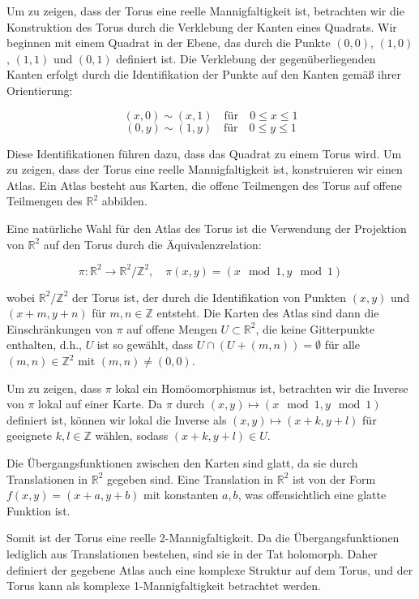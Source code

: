 Um zu zeigen, dass der Torus eine reelle Mannigfaltigkeit ist, betrachten wir die Konstruktion des Torus durch die Verklebung der Kanten eines Quadrats. Wir beginnen mit einem Quadrat in der Ebene, das durch die Punkte \( (0,0) \), \( (1,0) \), \( (1,1) \) und \( (0,1) \) definiert ist. Die Verklebung der gegenüberliegenden Kanten erfolgt durch die Identifikation der Punkte auf den Kanten gemäß ihrer Orientierung:

\[
(x,0) \sim (x,1) \quad \text{für} \quad 0 \leq x \leq 1
\]
\[
(0,y) \sim (1,y) \quad \text{für} \quad 0 \leq y \leq 1
\]

Diese Identifikationen führen dazu, dass das Quadrat zu einem Torus wird. Um zu zeigen, dass der Torus eine reelle Mannigfaltigkeit ist, konstruieren wir einen Atlas. Ein Atlas besteht aus Karten, die offene Teilmengen des Torus auf offene Teilmengen des \(\mathbb{R}^2\) abbilden.

Eine natürliche Wahl für den Atlas des Torus ist die Verwendung der Projektion von \(\mathbb{R}^2\) auf den Torus durch die Äquivalenzrelation:

\[
\pi: \mathbb{R}^2 \to \mathbb{R}^2 / \mathbb{Z}^2, \quad \pi(x,y) = (x \mod 1, y \mod 1)
\]

wobei \(\mathbb{R}^2 / \mathbb{Z}^2\) der Torus ist, der durch die Identifikation von Punkten \((x,y)\) und \((x+m, y+n)\) für \(m, n \in \mathbb{Z}\) entsteht. Die Karten des Atlas sind dann die Einschränkungen von \(\pi\) auf offene Mengen \(U \subset \mathbb{R}^2\), die keine Gitterpunkte enthalten, d.h., \(U\) ist so gewählt, dass \(U \cap (U + (m,n)) = \emptyset\) für alle \((m,n) \in \mathbb{Z}^2\) mit \((m,n) \neq (0,0)\).

Um zu zeigen, dass \(\pi\) lokal ein Homöomorphismus ist, betrachten wir die Inverse von \(\pi\) lokal auf einer Karte. Da \(\pi\) durch \((x,y) \mapsto (x \mod 1, y \mod 1)\) definiert ist, können wir lokal die Inverse als \((x,y) \mapsto (x+k, y+l)\) für geeignete \(k, l \in \mathbb{Z}\) wählen, sodass \((x+k, y+l) \in U\).

Die Übergangsfunktionen zwischen den Karten sind glatt, da sie durch Translationen in \(\mathbb{R}^2\) gegeben sind. Eine Translation in \(\mathbb{R}^2\) ist von der Form \(f(x,y) = (x+a, y+b)\) mit konstanten \(a, b\), was offensichtlich eine glatte Funktion ist.

Somit ist der Torus eine reelle 2-Mannigfaltigkeit. Da die Übergangsfunktionen lediglich aus Translationen bestehen, sind sie in der Tat holomorph. Daher definiert der gegebene Atlas auch eine komplexe Struktur auf dem Torus, und der Torus kann als komplexe 1-Mannigfaltigkeit betrachtet werden.

